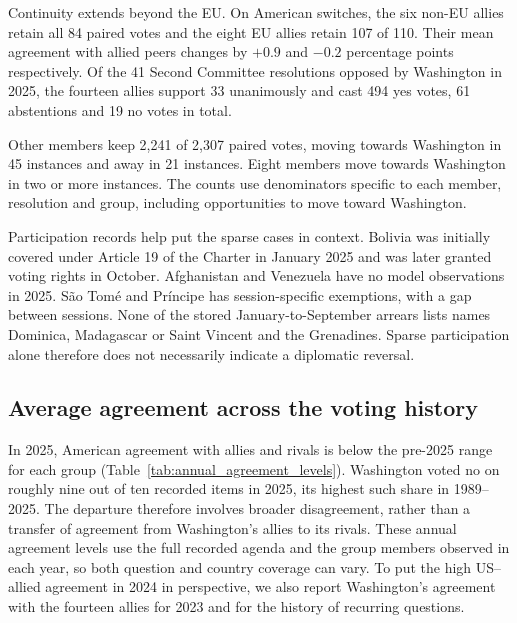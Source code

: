 \documentclass[10pt,authoryear]{elsarticle}
\begin{document}
Continuity extends beyond the EU. On American switches, the six non-EU allies retain all 84 paired votes and the eight EU allies retain 107 of 110. Their mean agreement with allied peers changes by $+0.9$ and $-0.2$ percentage points respectively. Of the 41 Second Committee resolutions opposed by Washington in 2025, the fourteen allies support 33 unanimously and cast 494 yes votes, 61 abstentions and 19 no votes in total.

Other members keep 2,241 of 2,307 paired votes, moving towards Washington in 45 instances and away in 21 instances. Eight members move towards Washington in two or more instances. The counts use denominators specific to each member, resolution and group, including opportunities to move toward Washington.

Participation records help put the sparse cases in context. Bolivia was initially covered under Article 19 of the Charter in January 2025 and was later granted voting rights in October. Afghanistan and Venezuela have no model observations in 2025. S\~ao Tom\'e and Pr\'incipe has session-specific exemptions, with a gap between sessions. None of the stored January-to-September arrears lists names Dominica, Madagascar or Saint Vincent and the Grenadines. Sparse participation alone therefore does not necessarily indicate a diplomatic reversal.

\subsection{Average agreement across the voting history}

In 2025, American agreement with allies and rivals is below the pre-2025 range for each group (Table~\ref{tab:annual_agreement_levels}). Washington voted no on roughly nine out of ten recorded items in 2025, its highest such share in 1989--2025. The departure therefore involves broader disagreement, rather than a transfer of agreement from Washington’s allies to its rivals. These annual agreement levels use the full recorded agenda and the group members observed in each year, so both question and country coverage can vary. To put the high US--allied agreement in 2024 in perspective, we also report Washington’s agreement with the fourteen allies for 2023 and for the history of recurring questions.
\end{document}
